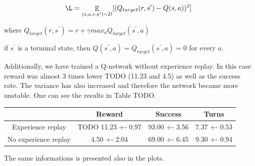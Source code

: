 \documentclass[12pt,titlepage,a4paper]{article}
\DeclareMathOperator*{\E}{\mathbb{E}}
\begin{document}
\[\L = \E_{(s, a, r, s^\prime) \sim D} [(Q_{target}(r,s^\prime) - Q(s, a))^2]\]

where $Q_{target}(r, s^\prime) = r + \gamma max_{a}Q_{target}(s^\prime,a)$

if $s^\prime$ is a terminal state, then $Q(s^\prime, a) = Q_{target}(s^\prime, a) = 0$ for every $a$.

Additionally, we have trained a Q-network without experience replay. In this case reward was almost 3 times lower TODO (11.23 and 4.5) as well as the success rate. The variance has also increased and therefore the network became more unstable. One can see the results in Table TODO.

\begin{center}
    \begin{tabular}{||c c c c||} 
     \hline
      & Reward & Success & Turns \\ [0.5ex] 
     \hline\hline
     Experience replay & TODO 11.23 +- 0.97 & 93.00 +- 3.56 & 7.37 +- 0.53 \\ 
     \hline
     No experience replay & 4.50 +- 2.04 & 69.00 +- 6.45 & 9.30 +- 0.94 \\
     \hline
    \end{tabular}
\end{center}

The same informations is presented also in the plots.
\end{document}
